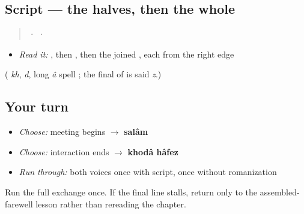 \subsection*{Script — the halves, then the whole}
\begin{quote}
 ·  · 
\end{quote}

\begin{itemize}
\raggedright
  \item \emph{Read it:} \textbf{}, then \textbf{}, then the joined \textbf{}, each from the right edge
\end{itemize}

(\textbf{} \emph{kh}, \textbf{} \emph{d}, \textbf{} long \emph{â} spell \textbf{}; the final \textbf{} of \textbf{} is said \emph{z}.)

\subsection*{Your turn}
\begin{itemize}
\raggedright
  \item \emph{Choose:} meeting begins $\to$ \textbf{salâm}
  \item \emph{Choose:} interaction ends $\to$ \textbf{khodâ hâfez}
  \item \emph{Run through:} both voices once with script, once without romanization
\end{itemize}

\begin{tcolorbox}[breakable,colback=teal!4,colframe=teal!35!black,title={Before you move on}]
Run the full exchange once. If the final line stalls, return only to the assembled-farewell lesson rather than rereading the chapter.
\end{tcolorbox}
